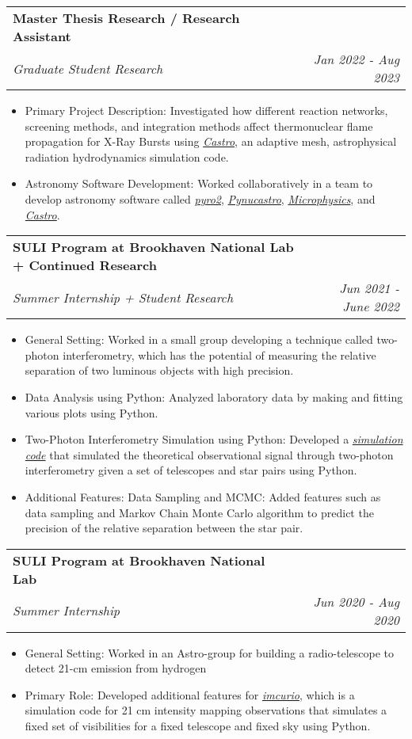\documentclass[a4paper,20pt]{article}
\makeatletter
\newcommand{\resumeItem}[2]{
  \item\small{
    \textrm{#1}{: #2 \vspace{-2pt}}
  }
}
\newcommand{\resumeSubheading}[4]{
  \vspace{-1pt}\item
    \begin{tabular*}{0.97\textwidth}{l@{\extracolsep{\fill}}r}
      \textbf{#1} & #2 \\
      \textit{#3} & \textit{#4} \\
    \end{tabular*}\vspace{-5pt}
}
\newcommand{\resumeItemListStart}{\begin{itemize}}
\newcommand{\resumeItemListEnd}{\end{itemize}\vspace{-5pt}}
\makeatother
\begin{document}
    \resumeSubheading
        {Master Thesis Research / Research Assistant}{}
        {Graduate Student Research}{Jan 2022 - Aug 2023}
		\resumeItemListStart
            \resumeItem{Primary Project Description}
            {Investigated how different reaction networks, screening methods, and integration methods affect thermonuclear flame propagation for X-Ray Bursts using \href{https://github.com/AMReX-Astro/Castro}{\emph{Castro}}, an adaptive mesh, astrophysical radiation hydrodynamics simulation code.}
            \resumeItem{Astronomy Software Development}{Worked collaboratively in a team to develop astronomy software called \href{https://github.com/python-hydro/pyro2}{\emph{pyro2}}, \href{https://github.com/pynucastro/pynucastro}{\emph{Pynucastro}}, \href{https://github.com/AMReX-Astro/Microphysics}{\emph{Microphysics}}, and \href{https://github.com/AMReX-Astro/Castro}{\emph{Castro}}.}
		\resumeItemListEnd		
\vspace{-2pt}


    \resumeSubheading
        {SULI Program at Brookhaven National Lab + Continued Research}{}%
        {Summer Internship + Student Research}{Jun 2021 - June 2022}
		\resumeItemListStart
            \resumeItem{General Setting}
            {Worked in a small group developing a technique called two-photon interferometry, which has the potential of measuring the relative separation of two luminous objects with high precision.}
            \resumeItem{Data Analysis using Python}
            {Analyzed laboratory data by making and fitting various plots using Python.}
            \resumeItem{Two-Photon Interferometry Simulation using Python}{Developed a \href{https://github.com/zhichen3/QA-sim}{\emph{simulation code}} that simulated the theoretical observational signal through two-photon interferometry given a set of telescopes and star pairs using Python.}
            \resumeItem{Additional Features: Data Sampling and MCMC}{Added features such as data sampling and Markov Chain Monte Carlo algorithm to predict the precision of the relative separation between the star pair.}
		\resumeItemListEnd
\vspace{-2pt}

    \resumeSubheading
        {SULI Program at Brookhaven National Lab}{}%
        {Summer Internship}{Jun 2020 - Aug 2020}
        \resumeItemListStart
            \resumeItem{General Setting}
            {Worked in an Astro-group for building a radio-telescope to detect 21-cm emission from hydrogen}
            \resumeItem{Primary Role}{Developed additional features for \href{https://github.com/radiohep/imcurio} {\emph{imcurio}}, which is a simulation code for 21 cm intensity mapping observations that simulates a fixed set of visibilities for a fixed telescope and fixed sky using Python.}
        \resumeItemListEnd
		
\end{document}
